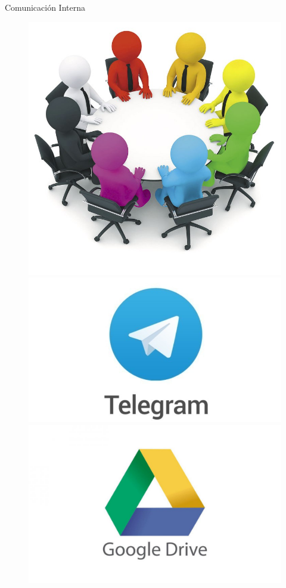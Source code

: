 \documentclass{beamer}
\begin{document}
\begin{frame}{Comunicaci\'on Interna}
	\begin{figure}[H]
	\centering
	\includegraphics[width=0.35\paperwidth, height=0.4\paperheight]{images_latex/reuniones2}
	\hspace{0.7cm}
	\includegraphics[width=0.35\paperwidth, height=0.4\paperheight]{images_latex/telegram}
	\includegraphics[width=0.35\paperwidth, height=0.4\paperheight]{images_latex/drive}

\end{figure}
\end{frame}
\end{document}
